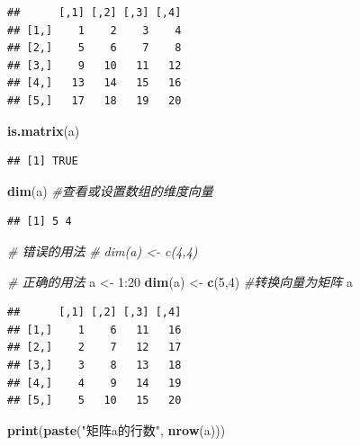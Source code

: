 \documentclass[]{article}
\newenvironment{Shaded}{\begin{snugshade}}{\end{snugshade}}
\newcommand{\KeywordTok}[1]{\textcolor[rgb]{0.13,0.29,0.53}{\textbf{{#1}}}}
\newcommand{\DecValTok}[1]{\textcolor[rgb]{0.00,0.00,0.81}{{#1}}}
\newcommand{\StringTok}[1]{\textcolor[rgb]{0.31,0.60,0.02}{{#1}}}
\newcommand{\CommentTok}[1]{\textcolor[rgb]{0.56,0.35,0.01}{\textit{{#1}}}}
\newcommand{\NormalTok}[1]{{#1}}
\numberwithin{figure}{section}
\numberwithin{table}{section}
\theoremstyle{definition}
\theoremstyle{definition}
\theoremstyle{definition}
\theoremstyle{remark}
\begin{document}
\begin{verbatim}
##      [,1] [,2] [,3] [,4]
## [1,]    1    2    3    4
## [2,]    5    6    7    8
## [3,]    9   10   11   12
## [4,]   13   14   15   16
## [5,]   17   18   19   20
\end{verbatim}

\begin{Shaded}
\begin{Highlighting}[]
\KeywordTok{is.matrix}\NormalTok{(a)}
\end{Highlighting}
\end{Shaded}

\begin{verbatim}
## [1] TRUE
\end{verbatim}

\begin{Shaded}
\begin{Highlighting}[]
\KeywordTok{dim}\NormalTok{(a) }\CommentTok{#查看或设置数组的维度向量}
\end{Highlighting}
\end{Shaded}

\begin{verbatim}
## [1] 5 4
\end{verbatim}

\begin{Shaded}
\begin{Highlighting}[]
\CommentTok{# 错误的用法}
\CommentTok{# dim(a) <- c(4,4)}
\end{Highlighting}
\end{Shaded}

\begin{Shaded}
\begin{Highlighting}[]
\CommentTok{# 正确的用法}
\NormalTok{a <-}\StringTok{ }\DecValTok{1}\NormalTok{:}\DecValTok{20}
\KeywordTok{dim}\NormalTok{(a) <-}\StringTok{ }\KeywordTok{c}\NormalTok{(}\DecValTok{5}\NormalTok{,}\DecValTok{4}\NormalTok{) }\CommentTok{#转换向量为矩阵}
\NormalTok{a}
\end{Highlighting}
\end{Shaded}

\begin{verbatim}
##      [,1] [,2] [,3] [,4]
## [1,]    1    6   11   16
## [2,]    2    7   12   17
## [3,]    3    8   13   18
## [4,]    4    9   14   19
## [5,]    5   10   15   20
\end{verbatim}

\begin{Shaded}
\begin{Highlighting}[]
\KeywordTok{print}\NormalTok{(}\KeywordTok{paste}\NormalTok{(}\StringTok{"矩阵a的行数"}\NormalTok{, }\KeywordTok{nrow}\NormalTok{(a)))}
\end{Highlighting}
\end{Shaded}
\end{document}
